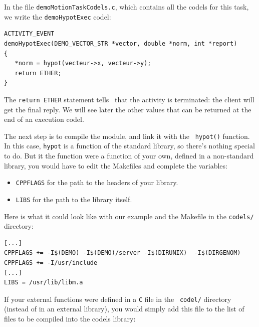 In the file {\tt demoMotionTaskCodels.c}, which contains all the codels
for this task, we write the {\tt demoHypotExec} codel:

\begin{center}\begin{cartouche}\small\begin{verbatim}
ACTIVITY_EVENT
demoHypotExec(DEMO_VECTOR_STR *vector, double *norm, int *report)
{
   *norm = hypot(vecteur->x, vecteur->y);
   return ETHER;
}
\end{verbatim}\end{cartouche}\end{center}

The {\tt  return  ETHER} statement tells   \GenoM\ that  the  activity is
terminated: the client will  get the final  reply. We will see  later the
other values that can be returned at the end of an execution codel.

The next  step is to  compile the   module,  and link   it with the  {\tt
hypot()} function.  In  this  case, {\tt  hypot} is   a function of   the
standard library, so there's nothing special  to do.  But it the function
were a function of your own, defined in a non-standard library, you would
have to edit the Makefiles and complete the variables:

\begin{itemize}
\item {\tt CPPFLAGS} for the path to the headers of your library.
\item {\tt LIBS} for the path to the library itself.
\end{itemize}

Here is what it could look like with our example and the Makefile in the
{\tt codels/} directory:

\begin{center}\begin{cartouche}\small\begin{verbatim}
[...]
CPPFLAGS += -I$(DEMO) -I$(DEMO)/server -I$(DIRUNIX)  -I$(DIRGENOM)
CPPFLAGS += -I/usr/include
[...]
LIBS = /usr/lib/libm.a
\end{verbatim}\end{cartouche}\end{center}

If your external functions  were defined in a  {\tt C}  file in the  {\tt
codel/} directory (instead of  in an external  library), you would simply
add this file to the   list  of files to  be   compiled into the   codels
library:


